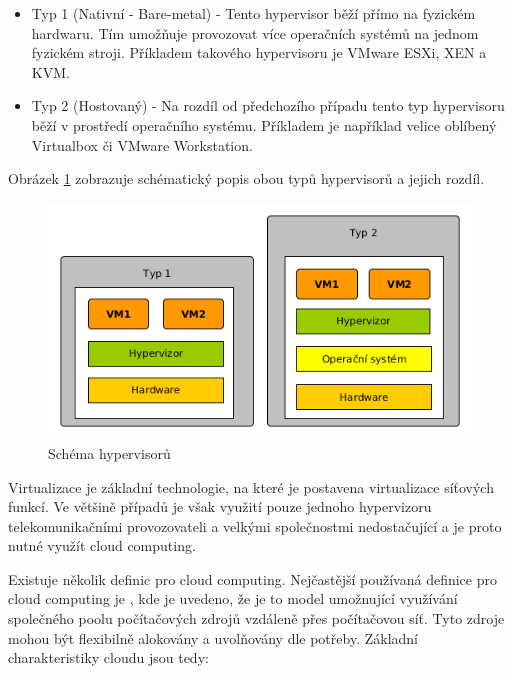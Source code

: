 \begin{itemize}
\item Typ 1 (Nativní - Bare-metal) - Tento hypervisor běží přímo na fyzickém hardwaru. Tím umožňuje provozovat více operačních systémů na jednom fyzickém stroji. Příkladem takového hypervisoru je VMware ESXi, XEN a KVM.
\item Typ 2 (Hostovaný) - Na rozdíl od předchozího případu tento typ hypervisoru běží v prostředí operačního systému. Příkladem je například velice oblíbený Virtualbox či VMware Workstation.
\end{itemize}

Obrázek \ref{fig:virtualization} zobrazuje schématický popis obou typů hypervisorů a jejich rozdíl.

\begin{figure}[h]
\begin{centering}
\includegraphics[scale=0.6]{images/virtualization}
\par\end{centering}
\caption{Schéma hypervisorů \label{fig:virtualization}}
\end{figure}

Virtualizace je základní technologie, na které je postavena virtualizace síťových funkcí. Ve většině případů je však využití pouze jednoho hypervizoru telekomunikačními provozovateli a velkými společnostmi nedostačující a je proto nutné využít cloud computing.

Existuje několik definic pro cloud computing. Nejčastější používaná definice pro cloud computing je \cite{nist_definition}, kde je uvedeno, že je to  model umožnující využívání společného poolu počítačových zdrojů vzdáleně přes počítačovou síť. Tyto zdroje mohou být flexibilně alokovány a uvolňovány dle potřeby. Základní charakteristiky cloudu jsou tedy:

